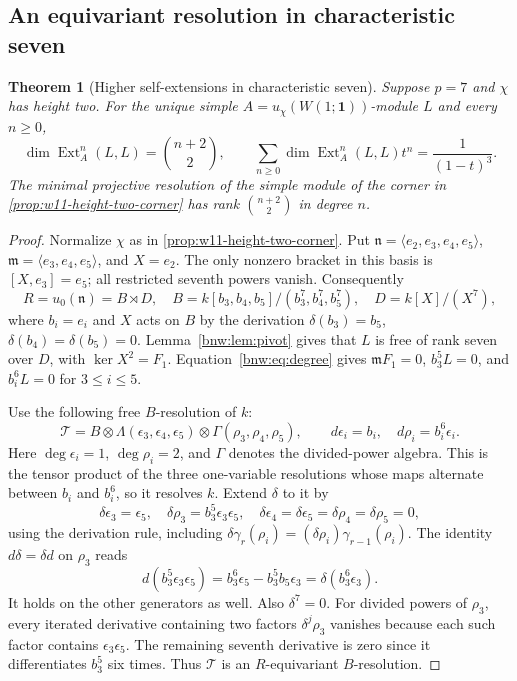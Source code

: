 \documentclass[11pt,reqno]{amsart}
\newtheorem{theorem}{Theorem}[section]
\theoremstyle{definition}
\theoremstyle{remark}
\theoremstyle{definition}
\newcommand{\Ext}{\operatorname{Ext}}
\begin{document}
\subsection{An equivariant resolution in characteristic seven}

\begin{theorem}[Higher self-extensions in characteristic seven]
\label{thm:w11-height-two-all-ext}
Suppose $p=7$ and $\chi$ has height two. For the unique simple
$A=u_\chi(W(1;\mathbf1))$-module $L$ and every $n\ge0$,
\[
 \dim\Ext_A^n(L,L)=\binom{n+2}{2},\qquad
 \sum_{n\ge0}\dim\Ext_A^n(L,L)t^n=\frac1{(1-t)^3}.
\]
The minimal projective resolution of the simple module of the corner
in \cref{prop:w11-height-two-corner} has rank $\binom{n+2}{2}$ in degree $n$.
\end{theorem}

\begin{proof}
Normalize $\chi$ as in \cref{prop:w11-height-two-corner}. Put
$\mathfrak n=\langle e_2,e_3,e_4,e_5\rangle$,
$\mathfrak m=\langle e_3,e_4,e_5\rangle$, and $X=e_2$.
The only nonzero bracket in this basis is $[X,e_3]=e_5$;
all restricted seventh powers vanish. Consequently
\[
 R=u_0(\mathfrak n)=B\rtimes D,\quad
 B=k[b_3,b_4,b_5]/(b_3^7,b_4^7,b_5^7),\quad D=k[X]/(X^7),
\]
where $b_i=e_i$ and $X$ acts on $B$ by the derivation
$\delta(b_3)=b_5$, $\delta(b_4)=\delta(b_5)=0$.
Lemma~\ref{bnw:lem:pivot} gives that $L$ is free of rank seven over
$D$, with $\ker X^2=F_1$. Equation~\eqref{bnw:eq:degree} gives
$\mathfrak m F_1=0$, $b_3^5L=0$, and $b_i^6L=0$ for $3\le i\le5$.

Use the following free $B$-resolution of $k$:
\[
 \mathcal T=B\otimes\Lambda(\epsilon_3,\epsilon_4,\epsilon_5)
 \otimes\Gamma(\rho_3,\rho_4,\rho_5),\qquad
 d\epsilon_i=b_i,\quad d\rho_i=b_i^6\epsilon_i.
\]
Here $\deg\epsilon_i=1$, $\deg\rho_i=2$, and $\Gamma$ denotes the
 divided-power algebra. This is the tensor product of the three
one-variable resolutions whose maps alternate between $b_i$ and $b_i^6$,
so it resolves $k$. Extend $\delta$ to it by
\[
 \delta\epsilon_3=\epsilon_5,\quad
 \delta\rho_3=b_3^5\epsilon_3\epsilon_5,\quad
 \delta\epsilon_4=\delta\epsilon_5=\delta\rho_4=\delta\rho_5=0,
\]
using the derivation rule, including
$\delta\gamma_r(\rho_i)=(\delta\rho_i)\gamma_{r-1}(\rho_i)$.
The identity $d\delta=\delta d$ on $\rho_3$ reads
\[
 d(b_3^5\epsilon_3\epsilon_5)
 =b_3^6\epsilon_5-b_3^5b_5\epsilon_3
 =\delta(b_3^6\epsilon_3).
\]
It holds on the other generators as well. Also $\delta^7=0$.
For divided powers of $\rho_3$, every iterated derivative containing
 two factors $\delta^j\rho_3$ vanishes because each such factor contains
$\epsilon_3\epsilon_5$. The remaining seventh derivative is zero
since it differentiates $b_3^5$ six times. Thus $\mathcal T$ is
an $R$-equivariant $B$-resolution.


\end{proof}
\end{document}
